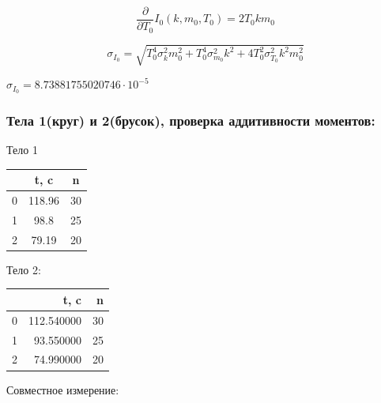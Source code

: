 \documentclass[12pt]{extarticle}
\begin{document}
\vspace{3mm}

$$\displaystyle \frac{\partial}{\partial T_{0}} I_{0}{\left(k,m_{0},T_{0} \right)} = 2 T_{0} k m_{0}$$

\vspace{3mm}

$$\displaystyle \sigma_{I_0} = \sqrt{T_{0}^{4} \sigma_{k}^{2} m_{0}^{2} + T_{0}^{4} \sigma_{m_0}^{2} k^{2} + 4 T_{0}^{2} \sigma_{T_0}^{2} k^{2} m_{0}^{2}}$$

\vspace{3mm}

$\displaystyle \sigma_{I_0} = 8.73881755020746 \cdot 10^{-5}$

\subsubsection{Тела 1(круг) и 2(брусок), проверка аддитивности моментов:}
\vspace{3mm}

\large{Тело 1}
\vspace{3mm}

\begin{center}
\begin{tabular}{lcc}
\toprule
 & t, c & n \\
\midrule
0 & 118.96 & 30 \\
1 & 98.8& 25 \\
2 & 79.19 & 20 \\
\bottomrule
\end{tabular}
\end{center}

\vspace{3mm}

\large{Тело 2:}
\vspace{3mm}

\begin{center}
\begin{tabular}{lrr}
\toprule
 & t, c & n \\
\midrule
0 & 112.540000 & 30 \\
1 & 93.550000 & 25 \\
2 & 74.990000 & 20 \\
\bottomrule
\end{tabular}
\end{center}


\vspace{3mm}

\large{Совместное измерение:}
\vspace{3mm}
\end{document}
